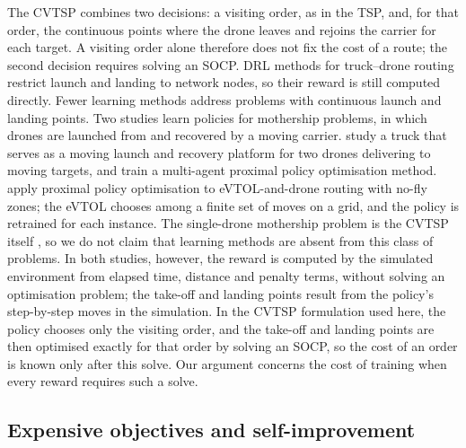 \documentclass[preprint,12pt,authoryear]{elsarticle}
\begin{document}
The CVTSP combines two decisions: a visiting order, as in the TSP, and, for that order, the continuous points where the drone leaves and rejoins the carrier for each target. A visiting order alone therefore does not fix the cost of a route; the second decision requires solving an SOCP. DRL methods for truck--drone routing \citep{bogyrbayeva2023,peng2025} restrict launch and landing to network nodes, so their reward is still computed directly. Fewer learning methods address problems with continuous launch and landing points. Two studies learn policies for mothership problems, in which drones are launched from and recovered by a moving carrier. \citet{yan2026} study a truck that serves as a moving launch and recovery platform for two drones delivering to moving targets, and train a multi-agent proximal policy optimisation method. \citet{liu2026} apply proximal policy optimisation to eVTOL-and-drone routing with no-fly zones; the eVTOL chooses among a finite set of moves on a grid, and the policy is retrained for each instance. The single-drone mothership problem is the CVTSP itself \citep{erdogan2021}, so we do not claim that learning methods are absent from this class of problems. In both studies, however, the reward is computed by the simulated environment from elapsed time, distance and penalty terms, without solving an optimisation problem; the take-off and landing points result from the policy's step-by-step moves in the simulation. In the CVTSP formulation used here, the policy chooses only the visiting order, and the take-off and landing points are then optimised exactly for that order by solving an SOCP, so the cost of an order is known only after this solve. Our argument concerns the cost of training when every reward requires such a solve.

\subsection{Expensive objectives and self-improvement}
\end{document}
